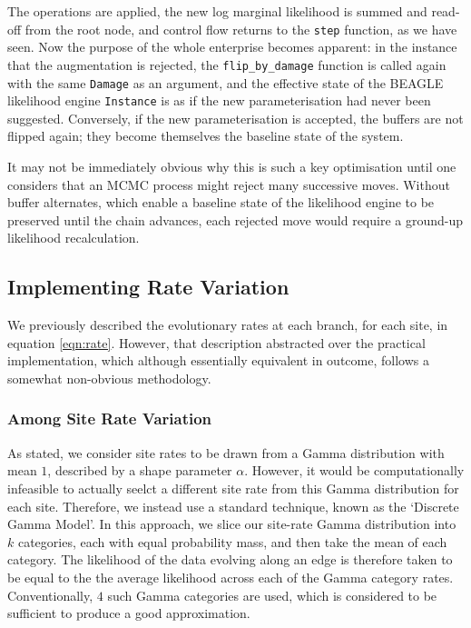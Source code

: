 \documentclass[10pt,journal,compsoc]{IEEEtran}
\begin{document}
The operations are applied, the new log marginal likelihood is summed and read-off from the root node, and control flow returns to the \texttt{step} function, as we have seen. Now the purpose of the whole enterprise becomes apparent: in the instance that the augmentation is rejected, the \texttt{flip\_by\_damage} function is called again with the same \texttt{Damage} as an argument, and the effective state of the BEAGLE likelihood engine \texttt{Instance} is as if the new parameterisation had never been suggested. Conversely, if the new parameterisation is accepted, the buffers are not flipped again; they become themselves the baseline state of the system.

It may not be immediately obvious why this is such a key optimisation until one considers that an MCMC process might reject many successive moves. Without buffer alternates, which enable a baseline state of the likelihood engine to be preserved until the chain advances, each rejected move would require a ground-up likelihood recalculation.

\subsection{Implementing Rate Variation}

We previously described the evolutionary rates at each branch, for each site, in equation \eqref{eqn:rate}. However, that description abstracted over the practical implementation, which although essentially equivalent in outcome, follows a somewhat non-obvious methodology.

\subsubsection{Among Site Rate Variation}

As stated, we consider site rates to be drawn from a Gamma distribution with mean $1$, described by a shape parameter $\alpha$. However, it would be computationally infeasible to actually seelct a different site rate from this Gamma distribution for each site. Therefore, we instead use a standard technique, known as the `Discrete Gamma Model'. In this approach, we slice our site-rate Gamma distribution into $k$ categories, each with equal probability mass, and then take the mean of each category. The likelihood of the data evolving along an edge is therefore taken to be equal to the the average  likelihood across each of the Gamma category rates. Conventionally, $4$ such Gamma categories are used, which is considered to be sufficient to produce a good approximation.
\end{document}
